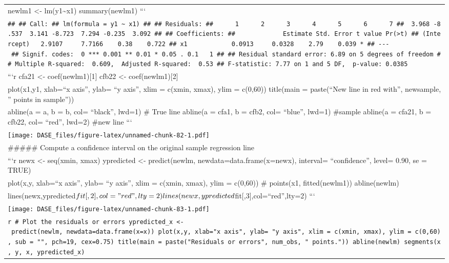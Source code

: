 \documentclass[
]{book}
\begin{document}
\begin{longtable}[]{@{}
  >{\raggedleft\arraybackslash}p{}@{}}
newlm1 \textless- lm(y1\textasciitilde x1)
summary(newlm1)
``` \\
\texttt{\#\#\ \#\#\ Call:\ \#\#\ lm(formula\ =\ y1\ \textasciitilde{}\ x1)\ \#\#\ \#\#\ Residuals:\ \#\#\ \ \ \ \ \ 1\ \ \ \ \ \ 2\ \ \ \ \ \ 3\ \ \ \ \ \ 4\ \ \ \ \ \ 5\ \ \ \ \ \ 6\ \ \ \ \ \ 7\ \#\#\ \ 3.968\ -8.537\ \ 3.141\ -8.723\ \ 7.294\ -0.235\ \ 3.092\ \#\#\ \#\#\ Coefficients:\ \#\#\ \ \ \ \ \ \ \ \ \ \ \ \ Estimate\ Std.\ Error\ t\ value\ Pr(\textgreater{}\textbar{}t\textbar{})\ \#\#\ (Intercept)\ \ \ 2.9107\ \ \ \ \ 7.7166\ \ \ \ 0.38\ \ \ \ 0.722\ \#\#\ x1\ \ \ \ \ \ \ \ \ \ \ \ 0.0913\ \ \ \ \ 0.0328\ \ \ \ 2.79\ \ \ \ 0.039\ *\ \#\#\ -\/-\/-\ \#\#\ Signif.\ codes:\ \ 0\ \textquotesingle{}***\textquotesingle{}\ 0.001\ \textquotesingle{}**\textquotesingle{}\ 0.01\ \textquotesingle{}*\textquotesingle{}\ 0.05\ \textquotesingle{}.\textquotesingle{}\ 0.1\ \textquotesingle{}\ \textquotesingle{}\ 1\ \#\#\ \#\#\ Residual\ standard\ error:\ 6.89\ on\ 5\ degrees\ of\ freedom\ \#\#\ Multiple\ R-squared:\ \ 0.609,\ \ Adjusted\ R-squared:\ \ 0.53\ \#\#\ F-statistic:\ 7.77\ on\ 1\ and\ 5\ DF,\ \ p-value:\ 0.0385} \\
```r
cfa21 \textless- coef(newlm1){[}1{]}
cfb22 \textless- coef(newlm1){[}2{]} \\
plot(x1,y1, xlab=``x axis'', ylab= ``y axis'', xlim = c(xmin, xmax), ylim = c(0,60))
title(main = paste(``New line in red with'', newsample, '' points in sample'')) \\
abline(a = a, b = b, col= ``black'', lwd=1) \# True line
abline(a = cfa1, b = cfb2, col= ``blue'', lwd=1) \#sample
abline(a = cfa21, b = cfb22, col= ``red'', lwd=2) \#new line
``` \\
\texttt{[image: DASE\_files/figure-latex/unnamed-chunk-82-1.pdf]} \\
\#\#\#\#\# Compute a confidence interval on the original sample regression line \\
```r
newx \textless- seq(xmin, xmax)
ypredicted \textless- predict(newlm, newdata=data.frame(x=newx), interval= ``confidence'', level= 0.90, se = TRUE) \\
plot(x,y, xlab=``x axis'', ylab= ``y axis'', xlim = c(xmin, xmax), ylim = c(0,60))
\# points(x1, fitted(newlm1))
abline(newlm) \\
lines(newx,ypredicted\(fit[,2],col="red",lty=2) lines(newx,ypredicted\)fit{[},3{]},col=``red'',lty=2)
``` \\
\texttt{[image: DASE\_files/figure-latex/unnamed-chunk-83-1.pdf]} \\
\texttt{r\ \#\ Plot\ the\ residuals\ or\ errors\ ypredicted\_x\ \textless{}-\ predict(newlm,\ newdata=data.frame(x=x))\ plot(x,y,\ xlab="x\ axis",\ ylab=\ "y\ axis",\ xlim\ =\ c(xmin,\ xmax),\ ylim\ =\ c(0,60),\ sub\ =\ "",\ pch=19,\ cex=0.75)\ title(main\ =\ paste("Residuals\ or\ errors",\ num\_obs,\ "\ points."))\ abline(newlm)\ segments(x,\ y,\ x,\ ypredicted\_x)} \\

\end{longtable}
\end{document}
